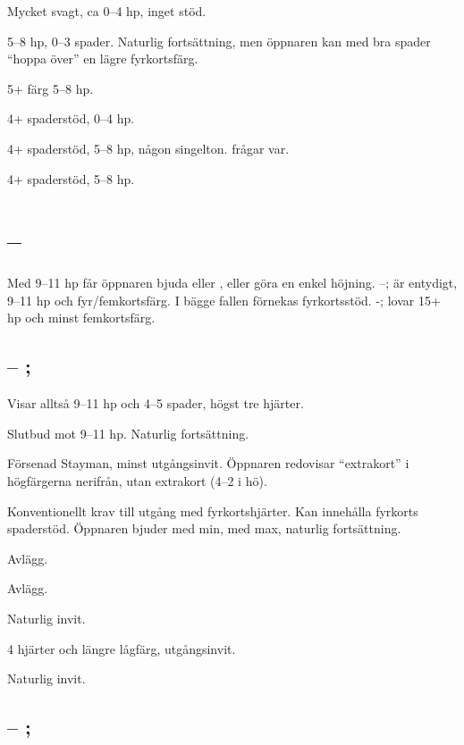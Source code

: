 \bbe
\item[--pass] Mycket svagt, ca 0--4 hp, inget stöd.
\item[--\NT{1}] 5--8 hp, 0--3 spader. Naturlig fortsättning, men öppnaren
  kan med bra spader ``hoppa över'' en lägre fyrkortsfärg. 
\item[--\la{2}, \hj{2}] 5+ färg 5--8 hp.
\item[--\spa{2}] 4+ spaderstöd, 0--4 hp.
\item[--\NT{2}] 4+ spaderstöd, 5--8 hp, någon singelton.  frågar var.
\item[--\spa{3}] 4+ spaderstöd, 5--8 hp.
\ebe
\section{ -- }

Med 9--11 hp f{\aa}r \"oppnaren bjuda  eller , eller g\"ora en
enkel h\"ojning. --;  \"ar entydigt,
9--11 hp och 
fyr/femkorts\-f\"arg. I b\"agge fallen
f\"ornekas fyrkortsst\"od. -;  lovar
15+ hp och minst femkortsf\"arg.

\subsection{ -- ; }

Visar alltså 9--11 hp och 4--5 spader, högst tre hjärter.

\bbe
   \item[--\NT{1}] Slutbud mot 9--11 hp. Naturlig fortsättning.
   \item[--\kl{2}] Försenad Stayman, minst utgångsinvit. Öppnaren redovisar
     ``extrakort'' i 
     högfärgerna nerifrån,  utan extrakort (4--2 i hö).
   \item[--\ru{2}] Konventionellt krav till utgång med fyrkortshjärter. Kan
     innehålla fyrkorts spaderstöd. Öppnaren bjuder  med min, 
     med max, naturlig fortsättning. 
   \item[--\hj{2}] Avlägg.
   \item[--\spa{2}] Avlägg.
   \item[--\NT{2}] Naturlig invit.
   \item[--\la{3}] 4 hjärter och längre lågfärg, utgångsinvit.
   \item[--\ho{3}] Naturlig invit.
\ebe

\subsection{ -- ; }


